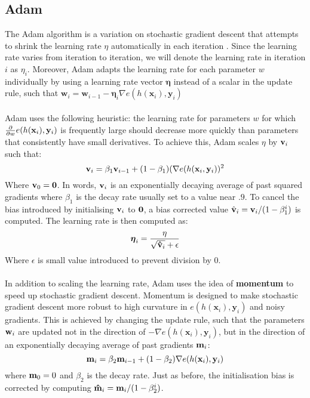 \subsection{Adam}
\label{adam}
The Adam algorithm is a variation on stochastic gradient descent that attempts to shrink the learning rate $\eta$ automatically in each iteration \citep{kingma2014}. Since the learning rate varies from iteration to iteration, we will denote the learning rate in iteration $i$ as $\eta_i$. Moreover, Adam adapts the learning rate for each parameter $w$ individually by using a learning rate vector $\boldsymbol{\eta}$ instead of a scalar in the update rule, such that $\mathbf{w}_i = \mathbf{w}_{i-1} - \boldsymbol{\eta}_i\nabla e(h(\mathbf{x}_i), \mathbf{y}_i)$
\\\\
Adam uses the following heuristic: the learning rate for parameters $w$ for which $\frac{\partial }{\partial w} e(h(\mathbf{x}_i), \mathbf{y}_i)$ is frequently large should decrease more quickly than parameters that consistently have small derivatives. To achieve this, Adam scales $\eta$ by $\mathbf{v}_i$ such that:
$$ 
\mathbf{v}_i = \beta_1 \mathbf{v}_{i - 1} + (1 - \beta_1)(\nabla e(h(\mathbf{x}_i, \mathbf{y}_i))^2
$$
Where $\mathbf{v}_0 = \mathbf{0}$. In words, $\mathbf{v}_i$ is an exponentially decaying average of past squared gradients where $\beta_1$ is the decay rate usually set to a value near $.9$. To cancel the bias introduced by initialising $\mathbf{v}_i$ to $\mathbf{0}$, a bias corrected value $\hat{\mathbf{v}}_i = \mathbf{v}_i / (1 - \beta_1^i)$ is computed. The learning rate is then computed as:
$$
\boldsymbol{\eta}_i = \frac{\eta}{\sqrt{{\mathbf{\hat{v}}_i}} + \epsilon}
$$
Where $\epsilon$ is small value introduced to prevent division by 0.
\\\\
In addition to scaling the learning rate, Adam uses the idea of \textbf{momentum} to speed up stochastic gradient descent. Momentum is designed to make stochastic gradient descent more robust to high curvature in $e(h(\mathbf{x}_i), \mathbf{y}_i)$ and noisy gradients. This is achieved by changing the update rule, such that the parameters $\mathbf{w}_i$ are updated not in the direction of $-\nabla e(h(\mathbf{x}_i), \mathbf{y}_i)$, but in the direction of an exponentially decaying average of past gradients $\mathbf{m}_i$:
$$
\mathbf{m}_i = \beta_2 \mathbf{m}_{i - 1} + (1 - \beta_2)\nabla e(h(\mathbf{x}_i), \mathbf{y}_i)
$$
where $\mathbf{m}_0 = 0$ and $\beta_2$ is the decay rate. Just as before, the initialisation bias is corrected by computing $\mathbf{\hat{m}}_i = \mathbf{m}_i / (1 - \beta_2^i)$.

